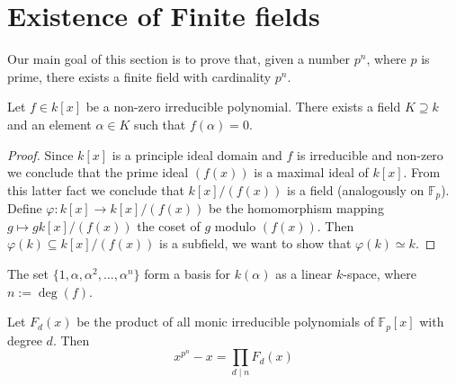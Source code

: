 \section{Existence of Finite fields}

\begin{remark}
   Our main goal of this section is to prove that, given a number \(p^n\), where
   \(p\) is prime, there exists a finite field with cardinality \(p^n\).
\end{remark}

\begin{proposition}
   Let \(f \in k[x]\) be a non-zero irreducible polynomial. There exists a field \(K
   \supseteq k\) and an element \(\alpha \in K\) such that \(f(\alpha) = 0\).
\end{proposition}

\begin{proof}
   Since \(k[x]\) is a principle ideal domain and \(f\) is irreducible and
   non-zero we conclude that the prime ideal \((f(x))\) is a maximal ideal of
   \(k[x]\). From this latter fact we conclude that \(k[x]/(f(x))\) is a
   field (analogously on \(\mathbb{F}_p\)). Define \(\varphi : k[x] \to
   k[x]/(f(x))\) be the homomorphism mapping \(g \mapsto g k[x]/(f(x))\) the
   coset of \(g\) modulo \((f(x))\). Then \(\varphi(k) \subseteq k[x]/(f(x))\)
   is a subfield, we want to show that \(\varphi(k) \simeq k\).
\end{proof}

\begin{proposition}\label{prop: basis fini}
   The set \(\{1, \alpha, \alpha^2, \dots, \alpha^n\} \) form a basis for
   \(k(\alpha)\) as a linear \(k\)-space, where \(n := \deg(f)\).
\end{proposition}

\begin{proposition}
   Let \(F_d(x)\) be the product of all monic irreducible polynomials of
   \(\mathbb{F}_p[x]\) with degree \(d\). Then 
   \[
      x^{p^n} - x = \prod_{d \mid n} F_d(x)
   \] 
\end{proposition}

